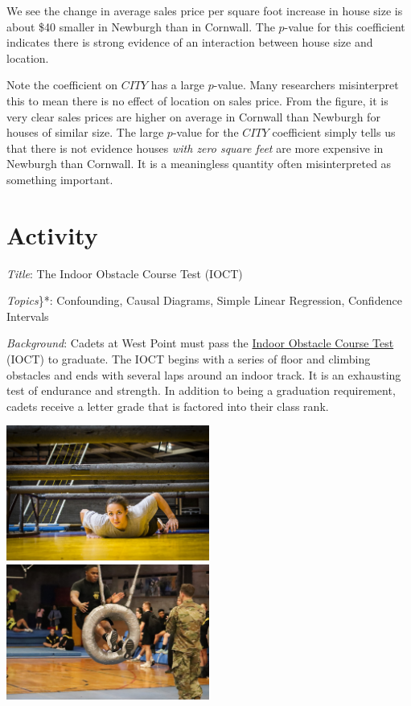\documentclass[]{book}
\begin{document}
We see the change in average sales price per square foot increase in house size is about \$40 smaller in Newburgh than in Cornwall. The \(p\)-value for this coefficient indicates there is strong evidence of an interaction between house size and location.

Note the coefficient on \(CITY\) has a large \(p\)-value. Many researchers misinterpret this to mean there is no effect of location on sales price. From the figure, it is very clear sales prices are higher on average in Cornwall than Newburgh for houses of similar size. The large \(p\)-value for the \(CITY\) coefficient simply tells us that there is not evidence houses \emph{with zero square feet} are more expensive in Newburgh than Cornwall. It is a meaningless quantity often misinterpreted as something important.

\hypertarget{activity}{%
\chapter{Activity}\label{activity}}

\emph{Title}: The Indoor Obstacle Course Test (IOCT)

\emph{Topics}\}*: Confounding, Causal Diagrams, Simple Linear Regression, Confidence Intervals

\emph{Background}: Cadets at West Point must pass the \href{https://www.youtube.com/watch?v=94tPO0fGtJo\&t=77s}{Indoor Obstacle Course Test} (IOCT) to graduate. The IOCT begins with a series of floor and climbing obstacles and ends with several laps around an indoor track. It is an exhausting test of endurance and strength. In addition to being a graduation requirement, cadets receive a letter grade that is factored into their class rank.

\includegraphics[width=0.5\textwidth,height=\textheight]{./images/crawlObstacle.jpg} \includegraphics[width=0.5\textwidth,height=\textheight]{./images/tireObstacle.jpg}
\end{document}
